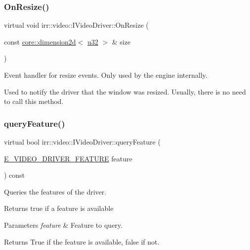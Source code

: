 \subsubsection{\texorpdfstring{On\+Resize()}{OnResize()}}
{\footnotesize\ttfamily virtual void irr\+::video\+::\+I\+Video\+Driver\+::\+On\+Resize (\begin{DoxyParamCaption}\item[{const \hyperlink{classirr_1_1core_1_1dimension2d}{core\+::dimension2d}$<$ \hyperlink{namespaceirr_a0416a53257075833e7002efd0a18e804}{u32} $>$ \&}]{size }\end{DoxyParamCaption})\hspace{0.3cm}{\ttfamily [pure virtual]}}



Event handler for resize events. Only used by the engine internally. 

Used to notify the driver that the window was resized. Usually, there is no need to call this method. \mbox{\label{classirr_1_1video_1_1IVideoDriver_adde468368b77441ada246e1603da4f47}} 
\subsubsection{\texorpdfstring{query\+Feature()}{queryFeature()}}
{\footnotesize\ttfamily virtual bool irr\+::video\+::\+I\+Video\+Driver\+::query\+Feature (\begin{DoxyParamCaption}\item[{\hyperlink{namespaceirr_1_1video_a57b1721e42a79c5dcf8e830e3621e08f}{E\+\_\+\+V\+I\+D\+E\+O\+\_\+\+D\+R\+I\+V\+E\+R\+\_\+\+F\+E\+A\+T\+U\+RE}}]{feature }\end{DoxyParamCaption}) const\hspace{0.3cm}{\ttfamily [pure virtual]}}



Queries the features of the driver. 

Returns true if a feature is available 
\begin{DoxyParams}{Parameters}
{\em feature} & Feature to query. \\
\hline
\end{DoxyParams}
\begin{DoxyReturn}{Returns}
True if the feature is available, false if not. 
\end{DoxyReturn}
\mbox{\label{classirr_1_1video_1_1IVideoDriver_a179990e76fa91175d46c891b3508e717}} 
